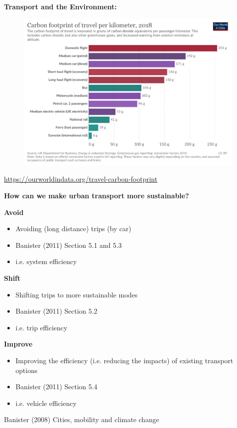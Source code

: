 \documentclass[aspectratio=169]{beamer}
\begin{document}
\begin{frame}
	
	\textbf{Transport and the Environment:}
	
	\begin{figure}
		\centering
		\includegraphics[width=0.84\linewidth]{images/carbon-footprint-travel-mode.png}
	\end{figure}

	\tiny\url{https://ourworldindata.org/travel-carbon-footprint}
	
\end{frame}




\begin{frame}
	
	\textbf{How can we make urban transport more sustainable?}
	
	\vspace{6mm}
	
	\textbf{Avoid}
	\begin{itemize}
		\item Avoiding (long distance) trips (by car)
		\item Banister (2011) Section 5.1 and 5.3
		\item i.e. system efficiency
	\end{itemize}

	\textbf{Shift}
	\begin{itemize}
		\item Shifting trips to more sustainable modes
		\item Banister (2011) Section 5.2
		\item i.e. trip efficiency
	\end{itemize}

	\textbf{Improve}
	\begin{itemize}
		\item Improving the efficiency (i.e. reducing the impacts) of existing transport options
		\item Banister (2011) Section 5.4
		\item i.e. vehicle efficiency
	\end{itemize}

	\vspace{2mm}
	
	\tiny{Banister (2008) Cities, mobility and climate change}
	
	
\end{frame}
\end{document}
